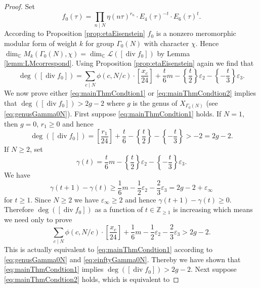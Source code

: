 \documentclass[12pt]{amsart}
\numberwithin{equation}{section}
\theoremstyle{plain}
\theoremstyle{definition}
\theoremstyle{remark}
\renewcommand\div{\mathop{\mathrm{div}}}
\newcommand\numC{\mathbb{C}}
\newcommand\numgeq[2]{\mathbb{#1}_{\geq #2}}
\begin{document}
\begin{proof}
Set
\begin{equation*}
f_0(\tau)=\prod_{n \mid N}\eta(n\tau)^{r_n}\cdot E_4(\tau)^{-t}\cdot E_6(\tau)^{t}.
\end{equation*}
According to Proposition \ref{prop:etaEisenstein} $f_0$ is a nonzero meromorphic modular form of weight $k$ for group $\Gamma_0(N)$ with character $\chi$. Hence $\dim_\numC M_k(\Gamma_0(N), \chi)=\dim_\numC\mathscr{L}([\div f_0])$ by Lemma \ref{lemm:LMcorrespond}. Using Proposition \ref{prop:etaEisenstein} again we find that
\begin{equation}
\label{eq:degdevf0}
\deg\left([\div f_0]\right)=\sum_{c\mid N}\phi(c,N/c)\cdot\left[\frac{x_c}{24}\right]+\frac{t}{6}m-\left\{\frac{t}{2}\right\}\varepsilon_2-\left\{-\frac{t}{3}\right\}\varepsilon_3.
\end{equation}
We now prove either \eqref{eq:mainThmCondtion1} or \eqref{eq:mainThmCondtion2} implies that $\deg\left([\div f_0]\right)>2g-2$ where $g$ is the genus of $X_{\Gamma_0(N)}$ (see \eqref{eq:genusGamma0N}). First suppose \eqref{eq:mainThmCondtion1} holds. If $N=1$, then $g=0$, $r_1\geq 0$ and hence
\begin{equation*}
\deg\left([\div f_0]\right)=\left[\frac{r_1}{24}\right]+\frac{t}{6}-\left\{\frac{t}{2}\right\}-\left\{-\frac{t}{3}\right\}>-2=2g-2.
\end{equation*}
If $N \geq 2$, set
\begin{equation*}
\gamma(t)=\frac{t}{6}m-\left\{\frac{t}{2}\right\}\varepsilon_2-\left\{-\frac{t}{3}\right\}\varepsilon_3.
\end{equation*}
We have
\begin{equation*}
\gamma(t+1)-\gamma(t)\geq\frac{1}{6}m-\frac{1}{2}\varepsilon_2-\frac{2}{3}\varepsilon_3=2g-2+\varepsilon_\infty
\end{equation*}
for $t \geq 1$. Since $N \geq 2$ we have $\varepsilon_\infty \geq 2$ and hence $\gamma(t+1)-\gamma(t)\geq 0$. Therefore $\deg\left([\div f_0]\right)$ as a function of $t\in\numgeq{Z}{1}$ is increasing which means we need only to prove
\begin{equation*}
\sum_{c\mid N}\phi(c,N/c)\cdot\left[\frac{x_c}{24}\right]+\frac{1}{6}m-\frac{1}{2}\varepsilon_2-\frac{2}{3}\varepsilon_3>2g-2.
\end{equation*}
This is actually equivalent to \eqref{eq:mainThmCondtion1} according to \eqref{eq:genusGamma0N} and \eqref{eq:einftyGamma0N}. Thereby we have shown that \eqref{eq:mainThmCondtion1} implies $\deg\left([\div f_0]\right)>2g-2$. Next suppose \eqref{eq:mainThmCondtion2} holds, which is equivalent to

\end{proof}
\end{document}
